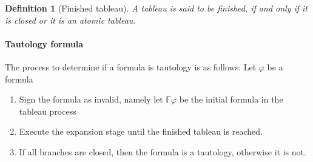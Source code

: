 \documentclass{article}
\newtheorem{defn}{Definition}[section]
\newcommand{\signF}{\mathbb{F}}
\begin{document}
		\begin{defn}[Finished tableau] 
A tableau is said to be finished, if and only if it is closed or it is an atomic tableau.
		\end{defn}

		\paragraph{Tautology formula} 
The process to determine if a formula is tautology is as follows:
Let $\varphi$ be a formula 
\begin{enumerate}
	\item Sign the formula as invalid, namely let $\signF\varphi$ be the initial formula in the tableau process
	\item Execute the expansion stage until the finished tableau is reached.
	\item If all branches are closed, then the formula is a tautology, otherwise it is not.
\end{enumerate}
\bigskip
\end{document}
